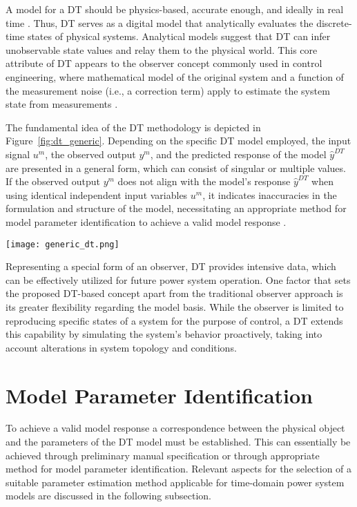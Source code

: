 A model for a DT should be physics-based, accurate enough, and ideally in real time \autocite{Wright_Davidson_2020, VANDERHORN2021113524}. Thus, DT serves as a digital model that analytically evaluates the discrete-time states of physical systems. Analytical models suggest that DT can infer unobservable state values and relay them to the physical world. This core attribute of DT appears to the observer concept commonly used in control engineering, where mathematical model of the original system and a function of the measurement noise (i.e., a correction term) apply to estimate the system state from measurements \autocite{simon2006optimal}. 

The fundamental idea of the DT methodology is depicted in Figure~\cref{fig:dt_generic}. Depending on the specific DT model employed, the input signal $u^m$, the observed output $y^m$, and the predicted response of the model $\hat{y}^{DT}$ are presented in a general form, which can consist of singular or multiple values. If the observed output $y^m$ does not align with the model's response $\hat{y}^{DT}$ when using identical independent input variables $u^m$, it indicates inaccuracies in the formulation and structure of the model, necessitating an appropriate method for model parameter identification to achieve a valid model response \autocite{BROSINSKY202379}.

\begin{figure*}[htbp]
    \centering
    \texttt{[image: generic\_dt.png]}
    \caption{Simplified generic view of DT.}
    \label{fig:dt_generic}
\end{figure*}

Representing a special form of an observer, DT provides intensive data, which can be effectively utilized for future power system operation. One factor that sets the proposed DT-based concept apart from the traditional observer approach is its greater flexibility regarding the model basis. While the observer is limited to reproducing specific states of a system for the purpose of control, a DT extends this capability by simulating the system's behavior proactively, taking into account alterations in system topology and conditions. 

\section{Model Parameter Identification}\label{sec:ch2/sec2}
To achieve a valid model response a correspondence between the physical object and the parameters of the DT model must be established. This can essentially be achieved through preliminary manual specification or through appropriate method for model parameter identification. Relevant aspects for the selection of a suitable parameter estimation method applicable for time-domain power system models are discussed in the following subsection.

